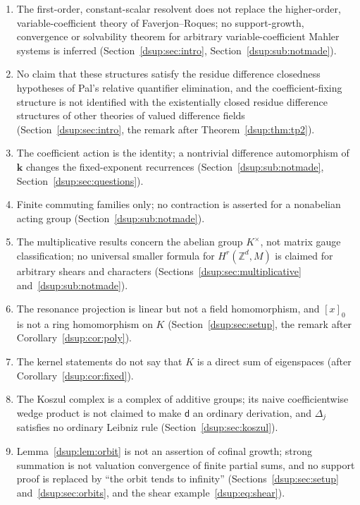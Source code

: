\documentclass[11pt,oneside]{article}
\numberwithin{equation}{section}
\theoremstyle{definition}
\theoremstyle{remark}
\newcommand{\Z}{\mathbb Z}
\newcommand{\kk}{\mathbf k}
\newcommand{\dd}{\mathsf d}
\begin{document}
\begin{enumerate}[label=\arabic*.,leftmargin=2.2em,itemsep=2pt]
and~\ref{dsup:ex:product} are illustrative calculations, not separate
claims of novelty (Section~\ref{dsup:sec:dilations}).
\item The first-order, constant-scalar resolvent does not replace the
higher-order, variable-coefficient theory of Faverjon--Roques; no
support-growth, convergence or solvability theorem for arbitrary
variable-coefficient Mahler systems is inferred
(Section~\ref{dsup:sec:intro}, Section~\ref{dsup:sub:notmade}).
\item No claim that these structures satisfy the residue difference
closedness hypotheses of Pal's relative quantifier elimination, and the
coefficient-fixing structure is not identified with the existentially
closed residue difference structures of other theories of valued
difference fields (Section~\ref{dsup:sec:intro}, the remark after
Theorem~\ref{dsup:thm:tp2}).
\item The coefficient action is the identity; a nontrivial difference
automorphism of $\kk$ changes the fixed-exponent recurrences
(Section~\ref{dsup:sub:notmade}, Section~\ref{dsup:sec:questions}).
\item Finite commuting families only; no contraction is asserted for a
nonabelian acting group (Section~\ref{dsup:sub:notmade}).
\item The multiplicative results concern the abelian group $K^\times$, not
matrix gauge classification; no universal smaller formula for
$H^r(\Z^d,M)$ is claimed for arbitrary shears and characters
(Sections~\ref{dsup:sec:multiplicative} and~\ref{dsup:sub:notmade}).
\item The resonance projection is linear but not a field homomorphism, and
$[x]_0$ is not a ring homomorphism on $K$ (Section~\ref{dsup:sec:setup}, the
remark after Corollary~\ref{dsup:cor:poly}).
\item The kernel statements do not say that $K$ is a direct sum of
eigenspaces (after Corollary~\ref{dsup:cor:fixed}).
\item The Koszul complex is a complex of additive groups; its naive
coefficientwise wedge product is not claimed to make $\dd$ an ordinary
derivation, and $\Delta_j$ satisfies no ordinary Leibniz rule
(Section~\ref{dsup:sec:koszul}).
\item Lemma~\ref{dsup:lem:orbit} is not an assertion of cofinal growth;
strong summation is not valuation convergence of finite partial sums, and
no support proof is replaced by ``the orbit tends to infinity''
(Sections~\ref{dsup:sec:setup} and~\ref{dsup:sec:orbits}, and the shear
example~\eqref{dsup:eq:shear}).

\end{enumerate}
\end{document}
